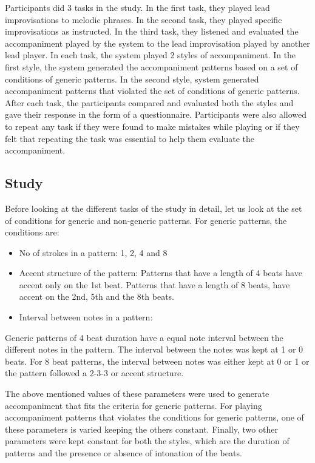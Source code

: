 Participants did 3 tasks in the study. In the first task, they played lead improvisations to melodic phrases. In the second task, they played specific improvisations as instructed. In the third task, they listened and evaluated the accompaniment played by the system to the lead improvisation played by another lead player. In each task, the system played 2 styles of accompaniment. In the first style, the system generated the accompaniment patterns based on a set of conditions of generic patterns. In the second style, system generated accompaniment patterns that violated the set of conditions of generic patterns. After each task, the participants compared and evaluated both the styles and gave their response in the form of a questionnaire. Participants were also allowed to repeat any task if they were found to make mistakes while playing or if they felt that repeating the task was essential to help them evaluate the accompaniment. 


\subsection{Study}

Before looking at the different tasks of the study in detail, let us look at the set of conditions for generic and non-generic patterns. For generic patterns, the conditions are:

\begin{itemize}

\item No of strokes in a pattern: 1, 2, 4 and 8

\item Accent structure of the pattern:
Patterns that have a length of 4 beats have accent only on the 1st beat. Patterns that have a length of 8 beats, have accent on the 2nd, 5th and the 8th beats. 

\item Interval between notes in a pattern:

\end{itemize}

Generic patterns of 4 beat duration have a equal note interval between the different notes in the pattern. The interval between the notes was kept at 1 or 0 beats. For 8 beat patterns, the interval between notes was either kept at 0 or 1 or the pattern followed a 2-3-3 or accent structure.

The above mentioned values of these parameters were used to generate accompaniment that fits the criteria for generic patterns. For playing accompaniment patterns that violates the conditions for generic patterns, one of these parameters is varied keeping the others constant. Finally, two other parameters were kept constant for both the styles, which are the duration of patterns and the presence or absence of intonation of the beats. 


